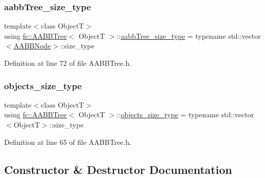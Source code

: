 \subsubsection{\texorpdfstring{aabb\+Tree\+\_\+size\+\_\+type}{aabbTree\_size\_type}}
{\footnotesize\ttfamily template$<$class ObjectT$>$ \\
using \hyperlink{classfc_1_1AABBTree}{fc\+::\+A\+A\+B\+B\+Tree}$<$ ObjectT $>$\+::\hyperlink{classfc_1_1AABBTree_a18706db5b992d8875e08dc325abf3811}{aabb\+Tree\+\_\+size\+\_\+type} =  typename std\+::vector$<$\hyperlink{structfc_1_1AABBTree_1_1AABBNode}{A\+A\+B\+B\+Node}$>$\+::size\+\_\+type\hspace{0.3cm}{\ttfamily [private]}}



Definition at line 72 of file A\+A\+B\+B\+Tree.\+h.

\mbox{\label{classfc_1_1AABBTree_a3333c421c1fa34841043bd8545de8ea8}} 
\subsubsection{\texorpdfstring{objects\+\_\+size\+\_\+type}{objects\_size\_type}}
{\footnotesize\ttfamily template$<$class ObjectT$>$ \\
using \hyperlink{classfc_1_1AABBTree}{fc\+::\+A\+A\+B\+B\+Tree}$<$ ObjectT $>$\+::\hyperlink{classfc_1_1AABBTree_a3333c421c1fa34841043bd8545de8ea8}{objects\+\_\+size\+\_\+type} =  typename std\+::vector$<$ObjectT$>$\+::size\+\_\+type\hspace{0.3cm}{\ttfamily [private]}}



Definition at line 65 of file A\+A\+B\+B\+Tree.\+h.



\subsection{Constructor \& Destructor Documentation}
\mbox{\label{classfc_1_1AABBTree_a4d8525582030f9cc79b68ed97271c000}} 

